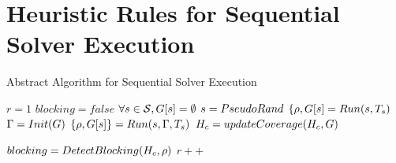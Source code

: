 \section{Heuristic Rules for Sequential Solver Execution}



\begin{algorithm}
\caption{Abstract Algorithm for Sequential Solver Execution \label{algoSolverCombination}}
\begin{algorithmic}
\State {}
\State {}
\State {}

\State $r = 1$
\State $blocking = false$
\State $\forall s  \in  \mathcal{S}, G [ s ] = \emptyset$   	
	 \State $s = PseudoRand$
	 \State {}   
	 \State $\{ \rho, G [s] = Run(s, T_{s})$ 
	  \Else
	 \ForAll{$\solver \in \solverset$}  		
		\State $\Gamma = Init(G)$
		\State {}
  		\State $\{ \rho, G[s] \} = Run(s, \Gamma, T_{s})$
		\State $H_c = updateCoverage(H_c,  G)$
      	
 	 \EndFor
         \EndIf	
         \State
\State {}
\State $blocking =  DetectBlocking(H_c, \rho)$ 
\State $r++$
\EndWhile
\end{algorithmic}
\end{algorithm}

